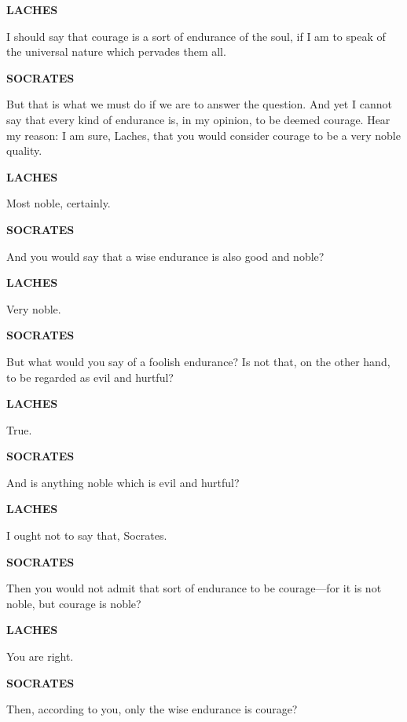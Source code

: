 \documentclass[11pt,letter]{book}
\begin{document}
\par \textbf{LACHES}
\par   I should say that courage is a sort of endurance of the soul, if I am to speak of the universal nature which pervades them all.

\par \textbf{SOCRATES}
\par   But that is what we must do if we are to answer the question. And yet I cannot say that every kind of endurance is, in my opinion, to be deemed courage. Hear my reason:  I am sure, Laches, that you would consider courage to be a very noble quality.

\par \textbf{LACHES}
\par   Most noble, certainly.

\par \textbf{SOCRATES}
\par   And you would say that a wise endurance is also good and noble?

\par \textbf{LACHES}
\par   Very noble.

\par \textbf{SOCRATES}
\par   But what would you say of a foolish endurance? Is not that, on the other hand, to be regarded as evil and hurtful?

\par \textbf{LACHES}
\par   True.

\par \textbf{SOCRATES}
\par   And is anything noble which is evil and hurtful?

\par \textbf{LACHES}
\par   I ought not to say that, Socrates.

\par \textbf{SOCRATES}
\par   Then you would not admit that sort of endurance to be courage—for it is not noble, but courage is noble?

\par \textbf{LACHES}
\par   You are right.

\par \textbf{SOCRATES}
\par   Then, according to you, only the wise endurance is courage?
\end{document}
